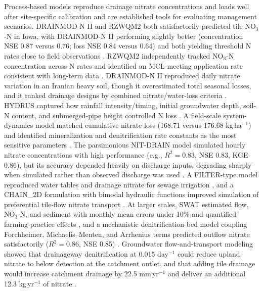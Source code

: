 \documentclass[11pt]{article}
\begin{document}
Process-based models reproduce drainage nitrate concentrations and loads well after site-specific calibration and are established tools for evaluating management scenarios. DRAINMOD-N II and RZWQM2 both satisfactorily predicted tile NO$_3$-N in Iowa, with DRAINMOD-N II performing slightly better (concentration NSE 0.87 versus 0.76; loss NSE 0.84 versus 0.64) and both yielding threshold N rates close to field observations \parencite{Du2017}. RZWQM2 independently tracked NO$_3$-N concentration across N rates and identified an MCL-meeting application rate consistent with long-term data \parencite{Qi2012}. DRAINMOD-N II reproduced daily nitrate variation in an Iranian heavy soil, though it overestimated total seasonal losses, and it ranked drainage designs by combined nitrate/water-loss criteria \parencite{Hashemi2020}. HYDRUS captured how rainfall intensity/timing, initial groundwater depth, soil-N content, and submerged-pipe height controlled N loss \parencite{Tao2021}. A field-scale system-dynamics model matched cumulative nitrate loss (168.71 versus 176.68 kg\,ha$^{-1}$) and identified mineralization and denitrification rate constants as the most sensitive parameters \parencite{Matinzadeh2017}. The parsimonious NIT-DRAIN model simulated hourly nitrate concentrations with high performance (e.g., $R^2=0.83$, NSE 0.83, KGE 0.86), but its accuracy depended heavily on discharge inputs, degrading sharply when simulated rather than observed discharge was used \parencite{Chelil2022}. A FILTER-type model reproduced water tables and drainage nitrate for sewage irrigation \parencite{Yang2008}, and a CHAIN\_2D formulation with bimodal hydraulic functions improved simulation of preferential tile-flow nitrate transport \parencite{Mohanty1998}. At larger scales, SWAT estimated flow, NO$_3$-N, and sediment with monthly mean errors under 10\% and quantified farming-practice effects \parencite{Chaplot2004}, and a mechanistic denitrification-bed model coupling Forchheimer, Michaelis--Menten, and Arrhenius terms predicted outflow nitrate satisfactorily ($R^2=0.86$, NSE 0.85) \parencite{Ghane2015}. Groundwater flow-and-transport modeling showed that drainageway denitrification at 0.015 day$^{-1}$ could reduce upland nitrate to below detection at the catchment outlet, and that adding tile drainage would increase catchment drainage by 22.5 mm\,yr$^{-1}$ and deliver an additional 12.3 kg\,yr$^{-1}$ of nitrate \parencite{Schilling2007}.

\printbibliography
\end{document}
